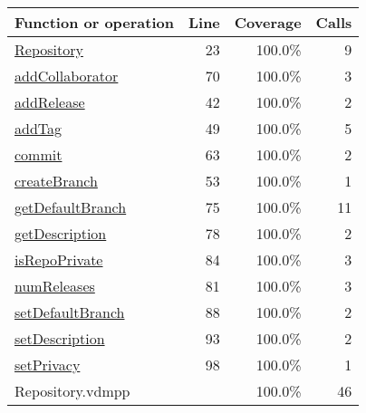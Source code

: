 \begin{longtable}{|l|r|r|r|}
\hline
Function or operation & Line & Coverage & Calls \\
\hline
\hline
\hyperref[Repository:23]{Repository} & 23&100.0\% & 9 \\
\hline
\hyperref[addCollaborator:70]{addCollaborator} & 70&100.0\% & 3 \\
\hline
\hyperref[addRelease:42]{addRelease} & 42&100.0\% & 2 \\
\hline
\hyperref[addTag:49]{addTag} & 49&100.0\% & 5 \\
\hline
\hyperref[commit:63]{commit} & 63&100.0\% & 2 \\
\hline
\hyperref[createBranch:53]{createBranch} & 53&100.0\% & 1 \\
\hline
\hyperref[getDefaultBranch:75]{getDefaultBranch} & 75&100.0\% & 11 \\
\hline
\hyperref[getDescription:78]{getDescription} & 78&100.0\% & 2 \\
\hline
\hyperref[isRepoPrivate:84]{isRepoPrivate} & 84&100.0\% & 3 \\
\hline
\hyperref[numReleases:81]{numReleases} & 81&100.0\% & 3 \\
\hline
\hyperref[setDefaultBranch:88]{setDefaultBranch} & 88&100.0\% & 2 \\
\hline
\hyperref[setDescription:93]{setDescription} & 93&100.0\% & 2 \\
\hline
\hyperref[setPrivacy:98]{setPrivacy} & 98&100.0\% & 1 \\
\hline
\hline
Repository.vdmpp & & 100.0\% & 46 \\
\hline
\end{longtable}

